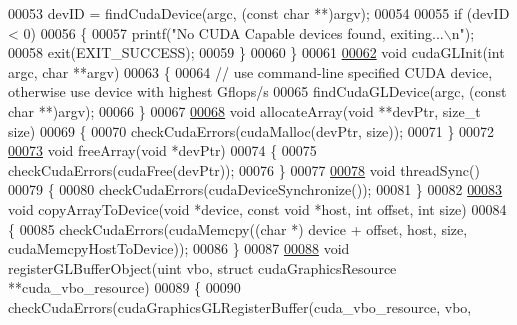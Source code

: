 \begin{DoxyCode}
00053         devID = findCudaDevice(argc, (\textcolor{keyword}{const} \textcolor{keywordtype}{char} **)argv);
00054 
00055         \textcolor{keywordflow}{if} (devID < 0)
00056         \{
00057             printf(\textcolor{stringliteral}{"No CUDA Capable devices found, exiting...\(\backslash\)n"});
00058             exit(EXIT\_SUCCESS);
00059         \}
00060     \}
00061 
\hypertarget{particle_system__cuda_8cu_source_l00062}{}\hyperlink{particle_system__cuda_8cu_a4e20ffdf94c8d60a5c32ecde149c8554}{00062}     \textcolor{keywordtype}{void} cudaGLInit(\textcolor{keywordtype}{int} argc, \textcolor{keywordtype}{char} **argv)
00063     \{
00064         \textcolor{comment}{// use command-line specified CUDA device, otherwise use device with highest Gflops/s}
00065         findCudaGLDevice(argc, (\textcolor{keyword}{const} \textcolor{keywordtype}{char} **)argv);
00066     \}
00067 
\hypertarget{particle_system__cuda_8cu_source_l00068}{}\hyperlink{particle_system__cuda_8cu_a781553d31085a23b6d0be9d19982759a}{00068}     \textcolor{keywordtype}{void} allocateArray(\textcolor{keywordtype}{void} **devPtr, size\_t size)
00069     \{
00070         checkCudaErrors(cudaMalloc(devPtr, size));
00071     \}
00072 
\hypertarget{particle_system__cuda_8cu_source_l00073}{}\hyperlink{particle_system__cuda_8cu_a2946519c8d9c4f8ebf552bf044821ea9}{00073}     \textcolor{keywordtype}{void} freeArray(\textcolor{keywordtype}{void} *devPtr)
00074     \{
00075         checkCudaErrors(cudaFree(devPtr));
00076     \}
00077 
\hypertarget{particle_system__cuda_8cu_source_l00078}{}\hyperlink{particle_system__cuda_8cu_af59f4c114812beed29874c0a1a31519d}{00078}     \textcolor{keywordtype}{void} threadSync()
00079     \{
00080         checkCudaErrors(cudaDeviceSynchronize());
00081     \}
00082 
\hypertarget{particle_system__cuda_8cu_source_l00083}{}\hyperlink{particle_system__cuda_8cu_ac4d4ecd921dbed6c2deef639ca295374}{00083}     \textcolor{keywordtype}{void} copyArrayToDevice(\textcolor{keywordtype}{void} *device, \textcolor{keyword}{const} \textcolor{keywordtype}{void} *host, \textcolor{keywordtype}{int} offset, \textcolor{keywordtype}{int} size)
00084     \{
00085         checkCudaErrors(cudaMemcpy((\textcolor{keywordtype}{char} *) device + offset, host, size, cudaMemcpyHostToDevice));
00086     \}
00087 
\hypertarget{particle_system__cuda_8cu_source_l00088}{}\hyperlink{particle_system__cuda_8cu_a4386a84282ceeaba09939817aa2a9c24}{00088}     \textcolor{keywordtype}{void} registerGLBufferObject(uint vbo, \textcolor{keyword}{struct} cudaGraphicsResource **cuda\_vbo\_resource)
00089     \{
00090         checkCudaErrors(cudaGraphicsGLRegisterBuffer(cuda\_vbo\_resource, vbo,

\end{DoxyCode}
